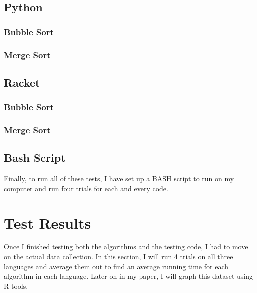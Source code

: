 \documentclass[]{report}
\begin{document}
		 	\subsection{Python}
		 		\subsubsection{Bubble Sort}
		 		
		 		
		 		
		 		\subsubsection{Merge Sort}
		 		
		 		
		 		
		    \subsection{Racket}
		 		\subsubsection{Bubble Sort}
		 		
		 		
		 		
		 		\subsubsection{Merge Sort}
		 		
		 		
		 		
		    \subsection{Bash Script}
		    Finally, to run all of these tests, I have set up a BASH script to run on my computer and run four trials for each and every code.
		    	
		    	
	  
	  
		\section{Test Results}
		Once I finished testing both the algorithms and the testing code, I had to move on the actual data collection. In this section, I will run 4 trials on all three languages and average them out to find an average running time for each algorithm in each language. Later on in my paper, I will graph this dataset using R tools.
\end{document}
